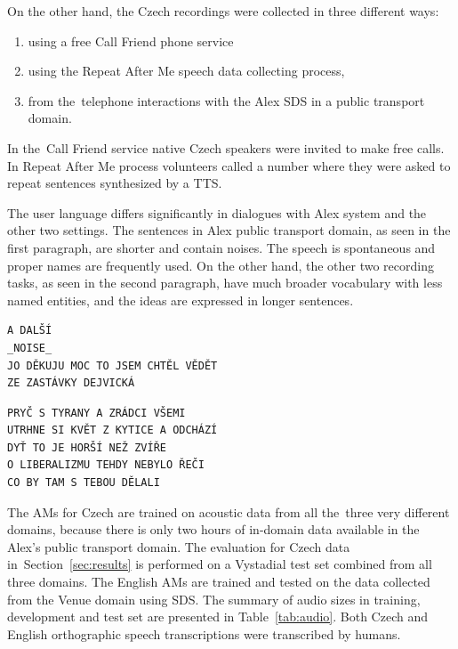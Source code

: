 On the other hand, the Czech recordings were collected in three different ways\cite{korvas_2014}:
\begin{enumerate}
    \item using a free Call Friend phone service
    \item using the Repeat After Me speech data collecting process,
    \item from the~telephone interactions with the Alex \ac{SDS} in a public transport domain.
\end{enumerate}

In the~Call Friend service native Czech speakers were invited to make free calls.
In Repeat After Me process volunteers called a number where they were asked to repeat 
sentences synthesized by a \ac{TTS}.

The user language differs significantly in dialogues with Alex system and the other two settings.
The sentences in Alex public transport domain, as seen in the first paragraph, are shorter and contain noises.
The speech is spontaneous and proper names are frequently used.
On the other hand, the other two recording tasks, as seen in the second paragraph, have much broader vocabulary with less named entities, and the ideas are expressed in longer sentences.

\begin{verbatim}
A DALŠÍ
_NOISE_
JO DĚKUJU MOC TO JSEM CHTĚL VĚDĚT
ZE ZASTÁVKY DEJVICKÁ
\end{verbatim}

\begin{verbatim}
PRYČ S TYRANY A ZRÁDCI VŠEMI
UTRHNE SI KVĚT Z KYTICE A ODCHÁZÍ
DYŤ TO JE HORŠÍ NEŽ ZVÍŘE
O LIBERALIZMU TEHDY NEBYLO ŘEČI
CO BY TAM S TEBOU DĚLALI
\end{verbatim}


The \acp{AM} for Czech are trained on acoustic data from all the~three very different domains, because there is only two hours of in-domain data available in the Alex's public transport domain.
The evaluation for Czech data in~Section~\ref{sec:results} is performed  on a Vystadial test set combined from all three domains.
The English \acp{AM} are trained and tested on the data collected from the Venue domain using \ac{SDS}.
The summary of audio sizes in training, development and test set are presented in Table~\ref{tab:audio}.
Both Czech and English orthographic speech transcriptions were transcribed by humans.

